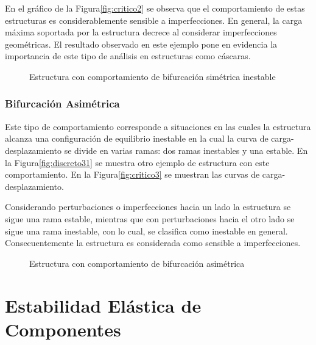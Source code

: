 En el gráfico de la Figura\autoref{fig:critico2} se observa que el comportamiento de estas estructuras es considerablemente sensible a imperfecciones. En general, la carga máxima soportada por la estructura decrece al considerar imperfecciones geométricas. El resultado observado en este ejemplo pone en evidencia la importancia de este tipo de análisis en estructuras como cáscaras.
\begin{figure}[htb]
	\centering
{}
\hspace{1em}
\caption{Estructura con comportamiento de bifurcación simétrica inestable}
	\label{fig:simetrica2}
\end{figure}

\subsubsection{Bifurcación Asimétrica}

Este tipo de comportamiento corresponde a situaciones en las cuales la estructura alcanza una configuración de equilibrio inestable en la cual la curva de carga-desplazamiento se divide en varias ramas: dos ramas inestables y una estable. En la
Figura\autoref{fig:discreto31} se muestra otro ejemplo de estructura con este comportamiento. En la Figura\autoref{fig:critico3} se muestran las curvas de carga-desplazamiento.

Considerando perturbaciones o imperfecciones hacia un lado la estructura se sigue una rama estable, mientras que con perturbaciones hacia el otro lado se sigue una rama inestable, con lo cual, se clasifica como inestable en general. Consecuentemente la estructura es considerada como sensible a imperfecciones.
\begin{figure}[htb]
	\centering
{}
\hspace{1em}
\caption{Estructura con comportamiento de bifurcación asimétrica}
	\label{fig:asimetrica}
\end{figure}


\section{Estabilidad Elástica de Componentes} \label{sec:componentes}

